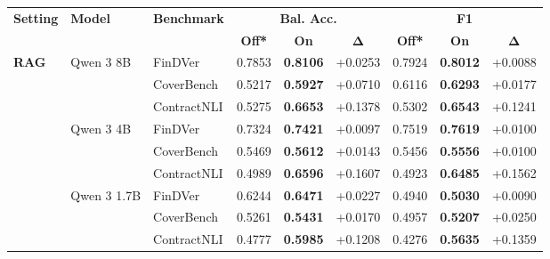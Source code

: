 \documentclass[11pt]{article}
\begin{document}
\begin{table}[H]
\centering
\scriptsize
\setlength{\tabcolsep}{4pt}
\renewcommand{\arraystretch}{1.08}

\begin{tabular}{lllccc|ccc}
\toprule
\multirow{2}{*}{\textbf{Setting}} &
\multirow{2}{*}{\textbf{Model}} &
\multirow{2}{*}{\textbf{Benchmark}} &
\multicolumn{3}{c|}{\textbf{Bal. Acc.}} &
\multicolumn{3}{c}{\textbf{F1}} \\
\cmidrule(lr){4-6}
\cmidrule(lr){7-9}

&
&
&
\textbf{Off*} & \textbf{On} & $\boldsymbol{\Delta}$
&
\textbf{Off*} & \textbf{On} & $\boldsymbol{\Delta}$
\\
\midrule

\multirow{9}{*}{\textbf{RAG}}
& \multirow{3}{*}{Qwen 3 8B}   & FinDVer     & 0.7853 & \textbf{0.8106} & +0.0253 & 0.7924 & \textbf{0.8012} & +0.0088 \\
& & CoverBench  & 0.5217 & \textbf{0.5927} & +0.0710 & 0.6116 & \textbf{0.6293} & +0.0177 \\
& & ContractNLI & 0.5275 & \textbf{0.6653} & +0.1378 & 0.5302 & \textbf{0.6543} & +0.1241 \\
\cmidrule(lr){2-9}
& \multirow{3}{*}{Qwen 3 4B}   & FinDVer     & 0.7324 & \textbf{0.7421} & +0.0097 & 0.7519 & \textbf{0.7619} & +0.0100 \\
& & CoverBench  & 0.5469 & \textbf{0.5612} & +0.0143 & 0.5456 & \textbf{0.5556} & +0.0100 \\
& & ContractNLI & 0.4989 & \textbf{0.6596} & +0.1607 & 0.4923 & \textbf{0.6485} & +0.1562 \\
\cmidrule(lr){2-9}
& \multirow{3}{*}{Qwen 3 1.7B} & FinDVer     & 0.6244 & \textbf{0.6471} & +0.0227 & 0.4940 & \textbf{0.5030} & +0.0090 \\
& & CoverBench  & 0.5261 & \textbf{0.5431} & +0.0170 & 0.4957 & \textbf{0.5207} & +0.0250 \\
& & ContractNLI & 0.4777 & \textbf{0.5985} & +0.1208 & 0.4276 & \textbf{0.5635} & +0.1359 \\

\midrule


\end{tabular}
\end{table}
\end{document}
